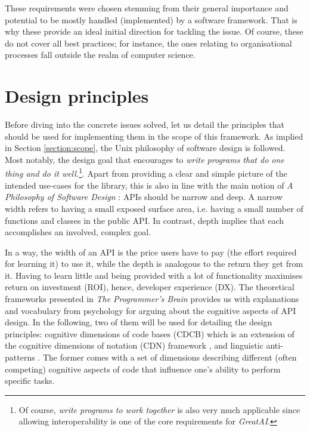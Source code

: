 These requirements were chosen stemming from their general importance and potential to be mostly handled (implemented) by a software framework. That is why these provide an ideal initial direction for tackling the issue. Of course, these do not cover all best practices; for instance, the ones relating to organisational processes fall outside the realm of computer science.

\section{Design principles}

Before diving into the concrete issues solved, let us detail the principles that should be used for implementing them in the scope of this framework. As implied in Section \ref{section:scope}, the Unix philosophy \cite{ritchie1978unix,salus1994quarter} of software design is followed. Most notably, the design goal that encourages to \textit{write programs that do one thing and do it well.}\footnote{Of course, \textit{write programs to work together} is also very much applicable since allowing interoperability is one of the core requirements for \textit{GreatAI}.}. Apart from providing a clear and simple picture of the intended use-cases for the library, this is also in line with the main notion of \textit{A Philosophy of Software Design} \cite{ousterhout2018philosophy}: APIs should be narrow and deep. A narrow width refers to having a small exposed surface area, i.e. having a small number of functions and classes in the public API. In contrast, depth implies that each accomplishes an involved, complex goal. 

In a way, the width of an API is the price users have to pay (the effort required for learning it) to use it, while the depth is analogous to the return they get from it. Having to learn little and being provided with a lot of functionality maximises return on investment (ROI), hence, developer experience (DX). The theoretical frameworks presented in \textit{The Programmer's Brain} \cite{hermans2021programmer} provides us with explanations and vocabulary from psychology for arguing about the cognitive aspects of API design. In the following, two of them will be used for detailing the design principles: cognitive dimensions of code bases (CDCB) which is an extension of the cognitive dimensions of notation (CDN) framework \cite{blackwell2001cognitive}, and linguistic anti-patterns \cite{arnaoudova2016linguistic}. The former comes with a set of dimensions describing different (often competing) cognitive aspects of code that influence one's ability to perform specific tasks.

